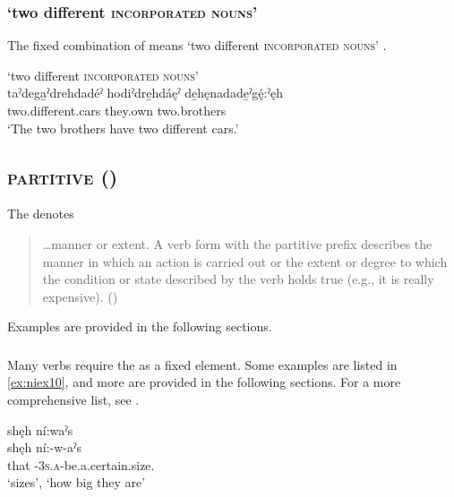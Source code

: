 \subsubsection*{ ‘two different \textsc{incorporated nouns}’} \label{[taˀde-incorporated noun-deˀ]}
The fixed combination of  means ‘two different \textsc{incorporated nouns}’ .

\ea\label{ex:pppexpressionex14}  ‘two different \textsc{incorporated nouns}’\\
\gll taˀdega̱ˀdrehdadéˀ hodiˀdre̱hdáęˀ de̱hęnadade̱ˀgę́:ˀęh \\
two.different.cars they.own two.brothers\\
\glt ‘The two brothers have two different cars.’ 
\z

\subsection{ \textsc{partitive} ({\partitive})} \label{[ni-] (partitive)}
The  \textsc{\partitive} denotes \begin{quote}
    
…manner or extent. A verb form with the partitive prefix describes the manner in which an action is carried out or the extent or degree to which the condition or state described by the verb holds true (e.g., it is really expensive). (\cite[98]{michelson_ontario_2011})\end{quote}  Examples are provided in the following sections.

\subsubsection*{} \label{[ni-verb]}
Many verbs require the  \textsc{\partitive} as a fixed element. Some examples are listed in \ref{ex:niex10}, and more are provided in the following sections. For a more comprehensive list, see .

\ea\label{ex:niex10}
\ea shęh ní:waˀs \\
\gll shęh ní:-w-aˀs\\
that \textsc{\partitive-3s.a}-be.a.certain.size.{\stative}\\
\glt ‘sizes’, ‘how big they are’ 

